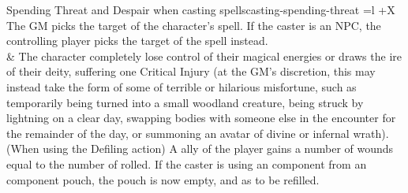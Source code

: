 \begin{table*}[!htb]
\begin{GenesysTable}{Spending Threat and Despair when casting spells}{casting-spending-threat}{ =l +X}
                                        The GM picks the target of the character's spell. If the caster is an NPC, the controlling player picks the target of the spell instead.\\
\despair\despair                   &    The character completely lose control of their magical energies or draws the ire of their deity, suffering one Critical Injury (at the GM's
                                        discretion, this may instead take the form of some of terrible or hilarious misfortune, such as temporarily being turned into a small woodland
                                        creature, being struck by lightning on a clear day, swapping bodies with someone else in the encounter for the remainder of the day, or
                                        summoning an avatar of divine or infernal wrath).\newline
                                        \newline
                                        (When using the Defiling action) A ally of the player gains a number of wounds equal to the number of \threat rolled.
                                        \newline
                                        If the caster is using an component from an component pouch, the pouch is now empty, and as to be refilled.\\
\end{GenesysTable}
\end{table*}

